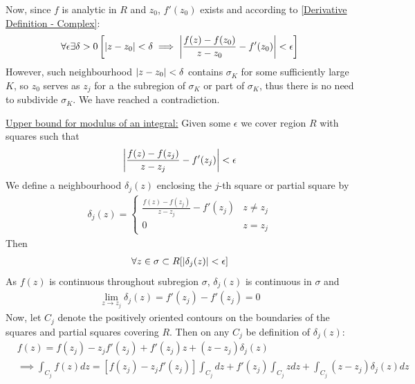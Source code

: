 \documentclass[12pt, english]{book}
\makeatletter
\renewenvironment{proof}[1][\proofname]{\par
	\pushQED{\qed}%
	\normalfont \topsep6\p@\@plus6\p@\relax
	\list{}{%
		\settowidth{\leftmargin}{\itshape\proofname:\hskip\labelsep}%
		\setlength{\labelwidth}{0pt}%
		\setlength{\itemindent}{-\leftmargin}%
		}%
	\item[\hskip\labelsep\itshape#1\@addpunct{:}]\ignorespaces
	}{\popQED\endlist\@endpefalse}
\makeatother
\begin{document}
\begin{proof}
\begin{proof}
			Now, since \(f\) is analytic in \(R\) and \(z_0\), \(f'(z_0)\) exists and according to \cref{Derivative Definition - Complex}:
			\begin{align*}
				\forall \epsilon \exists \delta >0 
				\left[\abs{z - z_0}< \delta \implies \abs{\frac{f(z) - f(z_0)}{z - z_0} - f'(z_0)} < \epsilon \right]
			\end{align*}
			However, such neighbourhood \(\abs{z-z_0}<\delta\) contains \(\sigma_K\) for some sufficiently large \(K\), so \(z_0\) serves as \(z_j\) for a the subregion of \(\sigma_K\) or part of \(\sigma_K\), thus there is no need to subdivide \(\sigma_K\). We have reached a contradiction.
		\end{proof}
	
		\underline{Upper bound for modulus of an integral:} \newline \newline
		Given some \(\epsilon\) we cover region \(R\) with squares such that
		\begin{align*}
			\abs{\frac{f(z) - f(z_j)}{z - z_j} - f'(z_j)} < \epsilon
		\end{align*}
		We define a neighbourhood \(\delta_j(z)\) enclosing the \(j\)-th square or partial square by
		\begin{align*}
			\delta_j(z) = 
			\begin{cases}
				\frac{f(z) - f(z_j)}{z-z_j} - f'(z_j) & z \neq z_j \\
				0 & z = z_j
			\end{cases}
		\end{align*}
		Then 
		\begin{align*}
			\forall z \in \sigma \subset R [\abs{\delta_j (z)} < \epsilon]
		\end{align*}
		As \(f(z)\) is continuous throughout subregion \(\sigma\),  \(\delta_j(z)\) is continuous in \(\sigma\) and 
		\begin{align*}
			\lim_{z \rightarrow z_j} \delta_j(z) = f'(z_j) - f'(z_j) = 0
		\end{align*}
		Now, let \(C_j\) denote the positively oriented contours on the boundaries of the squares and partial squares covering \(R\). Then on any \(C_j\) be definition of \(\delta_j(z)\):
		\begin{align*}
			&f(z) = f(z_j) - z_j f'(z_j) + f'(z_j) z + (z - z_j) \delta_j(z) \\
			&\implies \int_{C_j} f(z) dz = [f(z_j) - z_j f'(z_j)] \int_{C_j} dz + f'(z_j) \int_{C_j} z dz + \int_{C_j} (z - z_j) \delta_j(z) dz
		\end{align*}

\end{proof}
\end{document}

